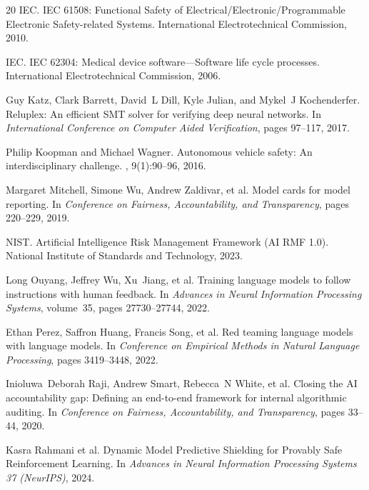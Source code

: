 \documentclass[sigconf,nonacm]{acmart}
\begin{document}
\begin{thebibliography}{20}
IEC.
\newblock IEC 61508: Functional Safety of Electrical/Electronic/Programmable Electronic Safety-related Systems.
\newblock International Electrotechnical Commission, 2010.

IEC.
\newblock IEC 62304: Medical device software---Software life cycle processes.
\newblock International Electrotechnical Commission, 2006.

Guy Katz, Clark Barrett, David~L Dill, Kyle Julian, and Mykel~J Kochenderfer.
\newblock Reluplex: An efficient SMT solver for verifying deep neural networks.
\newblock In {\em International Conference on Computer Aided Verification}, pages 97--117, 2017.

Philip Koopman and Michael Wagner.
\newblock Autonomous vehicle safety: An interdisciplinary challenge.
, 9(1):90--96, 2016.

Margaret Mitchell, Simone Wu, Andrew Zaldivar, et al.
\newblock Model cards for model reporting.
\newblock In {\em Conference on Fairness, Accountability, and Transparency}, pages 220--229, 2019.

NIST.
\newblock Artificial Intelligence Risk Management Framework (AI RMF 1.0).
\newblock National Institute of Standards and Technology, 2023.

Long Ouyang, Jeffrey Wu, Xu~Jiang, et al.
\newblock Training language models to follow instructions with human feedback.
\newblock In {\em Advances in Neural Information Processing Systems}, volume~35, pages 27730--27744, 2022.

Ethan Perez, Saffron Huang, Francis Song, et al.
\newblock Red teaming language models with language models.
\newblock In {\em Conference on Empirical Methods in Natural Language Processing}, pages 3419--3448, 2022.

Inioluwa~Deborah Raji, Andrew Smart, Rebecca~N White, et al.
\newblock Closing the AI accountability gap: Defining an end-to-end framework for internal algorithmic auditing.
\newblock In {\em Conference on Fairness, Accountability, and Transparency}, pages 33--44, 2020.

Kasra Rahmani et al.
\newblock Dynamic Model Predictive Shielding for Provably Safe Reinforcement Learning.
\newblock In {\em Advances in Neural Information Processing Systems 37 (NeurIPS)}, 2024.


\end{thebibliography}
\end{document}
